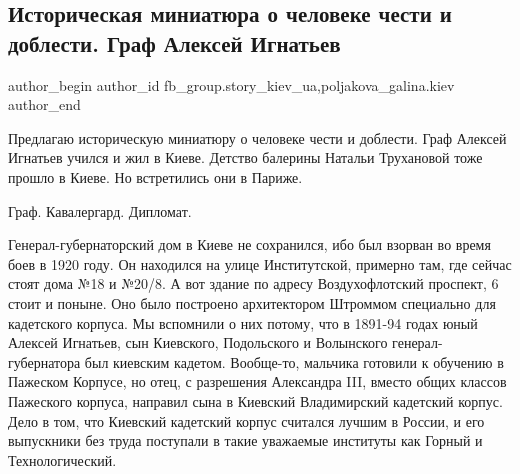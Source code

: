 
 
 
 
 
 
\subsection{Историческая миниатюра о человеке чести и доблести. Граф Алексей Игнатьев}
\label{sec:20_12_2021.fb.fb_group.story_kiev_ua.1.graf_aleksej_ignatjev}
 
\ifcmt
 author_begin
   author_id fb_group.story_kiev_ua,poljakova_galina.kiev
 author_end
\fi

Предлагаю историческую миниатюру о человеке чести и доблести. Граф Алексей
Игнатьев учился и жил в Киеве. Детство балерины Натальи Трухановой тоже прошло
в Киеве. Но встретились они в Париже. 

Граф. Кавалергард.  Дипломат. 

\begin{multicols}{2} %
\setlength{\parindent}{0pt}

\end{multicols} %

Генерал-губернаторский дом в Киеве не сохранился, ибо был взорван во время боев
в 1920 году. Он находился на улице Институтской, примерно там, где сейчас стоят
дома №18 и №20/8. А вот здание по адресу Воздухофлотский проспект, 6 стоит и
поныне. Оно было построено архитектором Штроммом специально для кадетского
корпуса. Мы вспомнили о них потому, что в 1891-94 годах юный Алексей Игнатьев,
сын Киевского, Подольского и Волынского генерал-губернатора был киевским
кадетом. Вообще-то, мальчика готовили к обучению в Пажеском Корпусе, но отец, с
разрешения Александра III, вместо общих классов Пажеского корпуса, направил
сына в Киевский Владимирский кадетский корпус. Дело в том, что Киевский
кадетский корпус считался лучшим в России, и его выпускники без труда поступали
в такие уважаемые институты как Горный и Технологический. 


